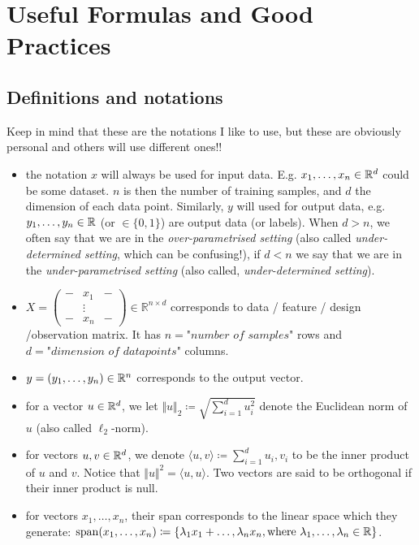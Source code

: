 \section{Useful Formulas and Good Practices}

\subsection{Definitions and notations}

Keep in mind that these are the notations I like to use, but these are obviously personal and others will use different ones!!
\begin{itemize}
    \item the notation $x$ will always be used for input data. E.g. $x_1, \dots, x_n \in \mathbb{R}^d$ could be some dataset. $n$ is then the number of training samples, and $d$ the dimension of each data point. Similarly, $y$ will used for output data, e.g. $y_1, \dots, y_n \in \mathbb{R}$ (or $\in \{0, 1\}$) are output data (or labels). When $d > n$, we often say that we are in the \textit{over-parametrised setting} (also called \textit{under-determined setting}, which can be confusing!), if $d < n$ we say that we are in the  \textit{under-parametrised setting} (also called, \textit{under-determined setting}).
    \item $X = \begin{pmatrix}
- & x_1 & - \\
  & \vdots &  \\
- & x_n & -
\end{pmatrix}
\in \mathbb{R}^{n \times d}$ corresponds to data / feature / design /observation matrix. It has $n = \textit{"number \ of \ samples"}$ rows and $d = \textit{"dimension \ of \ datapoints"}$ columns.
    \item $y = (y_1, \dots, y_n) \in \mathbb{R}^{n}$ corresponds to the output vector.
    \item for a vector $u \in \mathbb{R}^d$, we let $\Vert u \Vert_2 \coloneqq \sqrt{\sum_{i = 1}^d u_i^2}$ denote the Euclidean norm of $u$ (also called $\ell_2$-norm).
    \item for vectors $u, v \in \mathbb{R}^d$, we denote $\langle u, v \rangle \coloneqq \sum_{i = 1}^d u_i, v_i$ to be the inner product of $u$ and $v$. Notice that $\Vert u \Vert^2 = \langle u, u \rangle$. Two vectors are said to be orthogonal if their inner product is null.
    \item for vectors $x_1, \dots, x_n$, their span corresponds to the linear space which they generate: $\mathrm{span}(x_1, \dots, x_n) \coloneqq \{ \lambda_1 x_1 + \dots, \lambda_n x_n , \text{where} \  \lambda_1, \dots, \lambda_n \in \mathbb{R} \}$.

\end{itemize}
